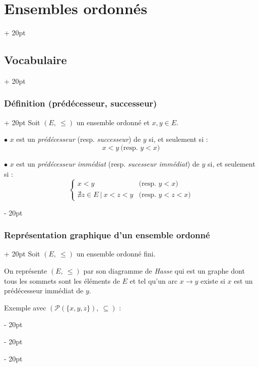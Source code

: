 \documentclass[a4paper, 12pt, twoside]{article}
\renewcommand{\le}{\leqslant}
\newcommand{\ind}[1][20pt]{\advance\leftskip + #1}
\newcommand{\deind}[1][20pt]{\advance\leftskip - #1}
\newenvironment{indt}[2][20pt]{#2 \par \ind[#1]}{\par \deind} %
\begin{document}
\begin{indt}{\section{Ensembles ordonnés}}
\begin{indt}{\subsection{Vocabulaire}}
            \vspace{6pt}
            
            \begin{indt}{\subsubsection{Définition (prédécesseur, successeur)}}
                Soit $(E,\ \le)$ un ensemble ordonné et $x, y \in E$.
                
                $\bullet$ $x$ est un \textit{prédécesseur} (resp. \textit{successeur}) de $y$ si, et seulement si :
                    \[ x < y\ \text{(resp. $y < x$)} \]
                
                $\bullet$ $x$ est un \textit{prédécesseur immédiat} (resp. \textit{sucesseur immédiat}) de $y$ si, et seulement si :
                    \[ \left\{\!\! \begin{array}{ll}
                        x < y
                        & \text{(resp. $y < x$)}
                        \\
                        \nexists z \in E\ |\ x < z < y
                        & \text{(resp. $y < z < x$)}
                    \end{array} \right. \]
            \end{indt}
            
            \vspace{6pt}
            
            \begin{indt}{\subsubsection{Représentation graphique d'un ensemble ordonné}}
                Soit $(E,\ \le)$ un ensemble ordonné fini.
                
                On représente $(E,\ \le)$ par son diagramme de \textit{Hasse} qui est un graphe dont tous les sommets sont les éléments de $E$ et tel qu'un arc $x \longrightarrow y$ existe si $x$ est un prédécesseur immédiat de $y$.
                
                \vspace{12pt}
                
                Exemple avec $(\mathcal P(\{x, y, z\}),\ \subseteq)$ :
                
                \begin{center}
                    

\end{center}
\end{indt}
\end{indt}
\end{indt}
\end{document}
